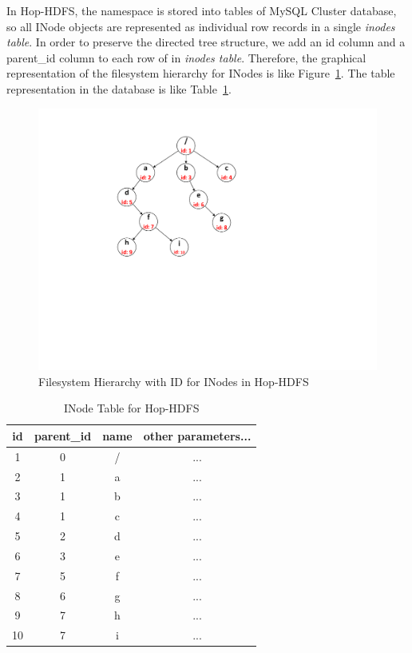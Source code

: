 \noindent In Hop-HDFS, the namespace is stored into tables of MySQL Cluster database, so all INode objects are represented as individual row records in a single \textit{inodes table}. In order to preserve the directed tree structure, we add an id column and a parent\_id column to each row of in \textit{inodes table}. Therefore, the graphical representation of the filesystem hierarchy for INodes is like Figure~\ref{fig:hoptree}. The table representation in the database is like Table~\ref{table:hoptreeTable}.

\begin{figure}[h]
	\centering
	\includegraphics[scale=1]{figs/hoptree.pdf}
	\caption{Filesystem Hierarchy with ID for INodes in Hop-HDFS}
	\label{fig:hoptree}
\end{figure}

\begin{table}[h]
	\centering
	\begin{tabular}{|c|c|c|c|}
		\hline
		\textbf{id} & \textbf{parent\_id} & \textbf{name} & \textbf{other parameters...} \\ \hline
		1 & 0 & / & ... \\ \hline
		2 & 1 & a & ... \\ \hline
		3 & 1 & b & ... \\ \hline
		4 & 1 & c & ... \\ \hline
		5 & 2 & d & ... \\ \hline
		6 & 3 & e & ... \\ \hline
		7 & 5 & f & ... \\ \hline
		8 & 6 & g & ... \\ \hline
		9 & 7 & h & ... \\ \hline
		10 & 7 & i & ... \\ \hline
	\end{tabular}
	\caption{INode Table for Hop-HDFS}
	\label{table:hoptreeTable}
\end{table}

